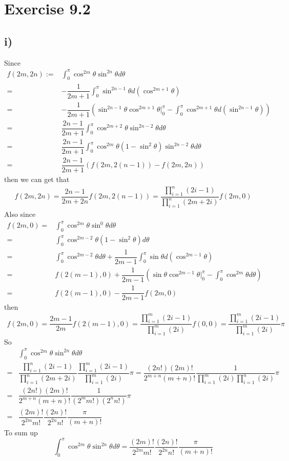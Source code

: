 \documentclass[a4paper,12pt,titlepage]{article}
\begin{document}
\section*{Exercise 9.2}
\subsection*{i)}
Since
\begin{align*}
f(2m,2n):=&\int_0^{\pi}\cos^{2m}\theta\sin^{2n}\theta d\theta\\
=&-\dfrac{1}{2m+1}\int_0^{\pi}\sin^{2n-1}\theta d(\cos^{2m+1}\theta)\\
=&-\dfrac{1}{2m+1}(\sin^{2n-1}\theta \cos^{2m+1}\theta|_0^{\pi}-\int_0^{\pi}\cos^{2m+1}\theta d(\sin^{2n-1}\theta))\\
=&\dfrac{2n-1}{2m+1}\int_0^{\pi}\cos^{2m+2}\theta\sin^{2n-2}\theta d\theta\\
=&\dfrac{2n-1}{2m+1}\int_0^{\pi}\cos^{2m}\theta(1-\sin^2\theta)\sin^{2n-2}\theta d\theta\\
=&\dfrac{2n-1}{2m+1}(f(2m,2(n-1))-f(2m,2n))
\end{align*}
then we can get that
\begin{align*}
f(2m,2n)=\dfrac{2n-1}{2m+2n}f(2m,2(n-1))=\dfrac{\prod\limits_{i=1}^n(2i-1)}{\prod\limits_{i=1}^n(2m+2i)}f(2m,0)
\end{align*}
Also since
\begin{align*}
f(2m,0)=&\int_0^{\pi}\cos^{2m}\theta\sin^{0}\theta d\theta\\
=&\int_0^{\pi}\cos^{2m-2}\theta(1-\sin^2\theta) d\theta\\
=&\int_0^{\pi}\cos^{2m-2}\theta d\theta+\dfrac{1}{2m-1}\int_0^{\pi}\sin\theta d(\cos^{2m-1}\theta)\\
=&f(2(m-1),0)+\dfrac{1}{2m-1}(\sin\theta\cos^{2m-1}\theta|_0^{\pi}-\int_0^{\pi}\cos^{2m}\theta d\theta)\\
=&f(2(m-1),0)-\dfrac{1}{2m-1}f(2m,0)
\end{align*}
then
\begin{align*}
f(2m,0)=\dfrac{2m-1}{2m}f(2(m-1),0)=\dfrac{\prod\limits_{i=1}^m(2i-1)}{\prod\limits_{i=1}^m(2i)}f(0,0)=\dfrac{\prod\limits_{i=1}^m(2i-1)}{\prod\limits_{i=1}^m(2i)}\pi
\end{align*}
So
\begin{align*}
&\int_0^{\pi}\cos^{2m}\theta\sin^{2n}\theta d\theta\\
=&\dfrac{\prod\limits_{i=1}^n(2i-1)}{\prod\limits_{i=1}^n(2m+2i)}\dfrac{\prod\limits_{i=1}^m(2i-1)}{\prod\limits_{i=1}^m(2i)}\pi=\dfrac{(2n!)(2m)!}{2^{m+n}(m+n)!}\dfrac{1}{\prod\limits_{i=1}^m(2i)\prod\limits_{i=1}^n(2i)}\pi\\
=&\dfrac{(2n!)(2m)!}{2^{m+n}(m+n)!}\dfrac{1}{(2^mm!)(2^nn!)}\pi\\
=&\dfrac{(2m)!}{2^{2m}m!}\dfrac{(2n)!}{2^{2n}n!}\dfrac{\pi}{(m+n)!}
\end{align*}
To sum up
$$\int_0^{\pi}\cos^{2m}\theta\sin^{2n}\theta d\theta=\dfrac{(2m)!}{2^{2m}m!}\dfrac{(2n)!}{2^{2n}n!}\dfrac{\pi}{(m+n)!}
$$
\end{document}
